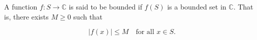 A function $f: S \to \mathbb{C}$ is said to be bounded if $f(S)$ is a bounded set in $\mathbb{C}$. That is, there exists $M \geq 0$ such that

$$|f(x)| \leq M \quad \text{for all } x \in S.$$
